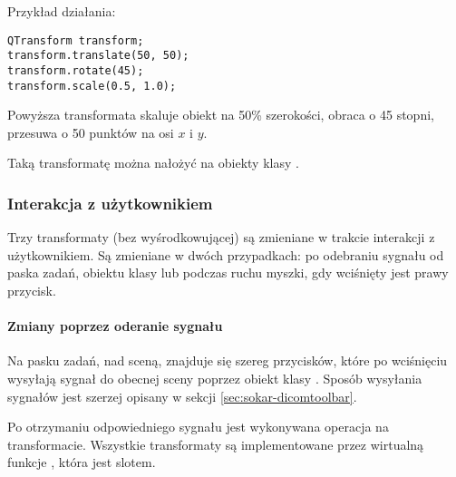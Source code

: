 Przykład działania:
\begin{lstlisting}
QTransform transform;
transform.translate(50, 50);
transform.rotate(45);
transform.scale(0.5, 1.0);
\end{lstlisting}
Powyższa transformata skaluje obiekt na 50\% szerokości, obraca o 45 stopni, przesuwa o 50 punktów na osi $x$ i $y$.

\par
Taką transformatę można nałożyć na obiekty klasy .

\subsubsection{Interakcja z użytkownikiem}

Trzy transformaty (bez wyśrodkowującej) są zmieniane w trakcie interakcji z użytkownikiem.
Są zmieniane w dwóch przypadkach: po odebraniu sygnału od paska zadań, obiektu klasy  lub podczas ruchu myszki, gdy wciśnięty jest prawy przycisk.

\paragraph{Zmiany poprzez oderanie sygnału}

\par
Na pasku zadań, nad sceną, znajduje się szereg przycisków, które po wciśnięciu wysyłają sygnał do obecnej sceny poprzez obiekt klasy .
Sposób wysyłania sygnałów jest szerzej opisany w sekcji \ref{sec:sokar-dicomtoolbar}.

\par
Po otrzymaniu odpowiedniego sygnału jest wykonywana operacja na transformacie.
Wszystkie transformaty są implementowane przez wirtualną funkcje , która jest slotem.

